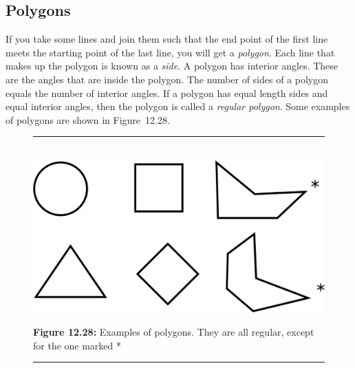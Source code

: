     
    
    
    
    
  
    
    
    
    
    \label{m39368*cid5}
            \subsection{ Polygons}
            \nopagebreak
            
      
      \label{m39368*id317435}If you take some lines and join them such that the end point of the first line meets the starting point of the last line, you will get a \textsl{polygon}. Each line that makes up the polygon is known as a \textsl{side}. A polygon has interior angles. These are the angles that are inside the polygon. The number of sides of a polygon equals the number of interior angles. If a polygon has equal length sides and equal interior angles, then the polygon is called a \textsl{regular polygon}. Some examples of polygons are shown in Figure~12.28.\par 
      
    \setcounter{subfigure}{0}


	\begin{figure}[H] %
    \begin{center}
    \rule[.1in]{\figurerulewidth}{.005in} \\
        \label{m39368*uid37!!!underscore!!!media}\label{m39368*uid37!!!underscore!!!printimage}\includegraphics[width=.8\columnwidth]{col11306.imgs/m39368_MG10C13_0221.png} %
        
      \vspace{2pt}
    \vspace{\rubberspace}\par \begin{cnxcaption}
	  \small \textbf{Figure 12.28: }Examples of polygons. They are all regular, except for the one marked *
	\end{cnxcaption}
      
    \vspace{.1in}
    \rule[.1in]{\figurerulewidth}{.005in} \\
        
    \end{center}

 \end{figure}   

